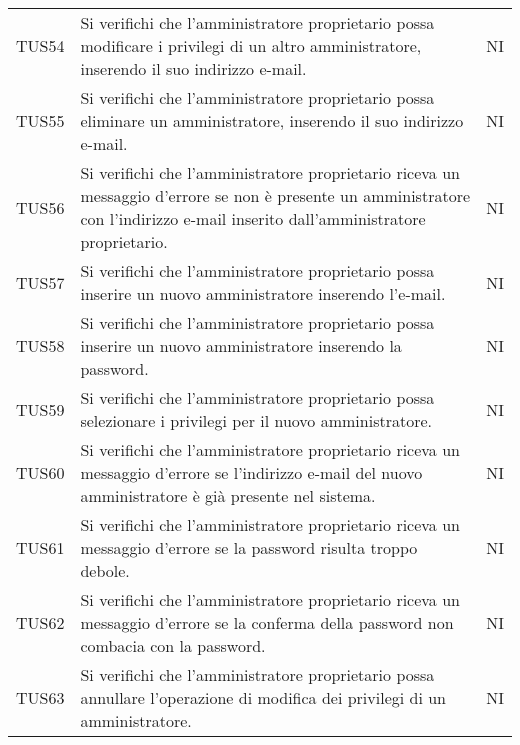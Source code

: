 {\begin{longtable}{ c C{13cm} C{1cm}}
TUS54 & Si verifichi che l’amministratore proprietario possa modificare i privilegi di un altro amministratore, inserendo il suo indirizzo e-mail. & NI \\
TUS55 & Si verifichi che l’amministratore proprietario possa eliminare un amministratore, inserendo il suo indirizzo e-mail. & NI \\
TUS56 & Si verifichi che l’amministratore proprietario riceva un messaggio d'errore se non è presente un amministratore con l'indirizzo e-mail inserito dall'amministratore proprietario. & NI \\
TUS57 & Si verifichi che l’amministratore proprietario possa inserire un nuovo amministratore inserendo l’e-mail. & NI \\
TUS58 & Si verifichi che l’amministratore proprietario possa inserire un nuovo amministratore inserendo la password. & NI \\
TUS59 & Si verifichi che l’amministratore proprietario possa selezionare i privilegi per il nuovo amministratore. & NI \\
TUS60 & Si verifichi che l’amministratore proprietario riceva un messaggio d'errore se l'indirizzo e-mail del nuovo amministratore è già presente nel sistema. & NI \\
TUS61 & Si verifichi che l’amministratore proprietario riceva un messaggio d'errore se la password risulta troppo debole. & NI \\
TUS62 & Si verifichi che l’amministratore proprietario riceva un messaggio d'errore se la conferma della password non combacia con la password. & NI \\
TUS63 & Si verifichi che l’amministratore proprietario possa annullare l'operazione di modifica dei privilegi di un amministratore.  & NI \\
\end{longtable}
}
